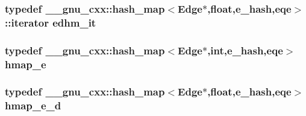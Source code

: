 \subsubsection{\setlength{\rightskip}{0pt plus 5cm}typedef \_\-\_\-gnu\_\-cxx::hash\_\-map$<${\bf Edge}$\ast$,float,{\bf e\_\-hash},{\bf eqe}$>$::iterator {\bf edhm\_\-it}}\label{state_8h_8a8f9f7c68d92a9aae8d9c5e48076d73}


\subsubsection{\setlength{\rightskip}{0pt plus 5cm}typedef \_\-\_\-gnu\_\-cxx::hash\_\-map$<${\bf Edge}$\ast$,int,{\bf e\_\-hash},{\bf eqe}$>$ {\bf hmap\_\-e}}\label{state_8h_77a60321e398a6e048de9abbb6ad0241}


\subsubsection{\setlength{\rightskip}{0pt plus 5cm}typedef \_\-\_\-gnu\_\-cxx::hash\_\-map$<${\bf Edge}$\ast$,float,{\bf e\_\-hash},{\bf eqe}$>$ {\bf hmap\_\-e\_\-d}}\label{state_8h_19d46eafcbb0b17c734464eb75a2cd4f}


